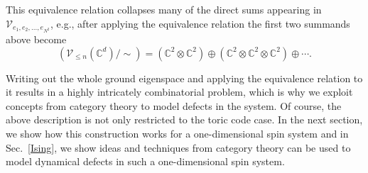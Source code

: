 This equivalence relation collapses many of the direct sums appearing in $\mathcal{V}_{e_1,e_2,\ldots,e_{N^2}}$, e.g., after applying the equivalence relation the first two summands above become
\begin{equation}
	\left(\mathcal{V}_{\le n}(\mathbb{C}^d)/\sim\right) = (\mathbb{C}^2\otimes \mathbb{C}^2)\oplus (\mathbb{C}^2\otimes \mathbb{C}^2\otimes \mathbb{C}^2)\oplus \cdots.
\end{equation}

Writing out the whole ground eigenspace and applying the equivalence relation to it results in a highly intricately combinatorial problem, which is why we exploit concepts from category theory to model defects in the system. Of course, the above description is not only restricted to the toric code case. In the next section, we show how this construction works for a one-dimensional spin system and in Sec.~\ref{Ising}, we show ideas and techniques from category theory can be used to model dynamical defects in such a one-dimensional spin system.

  
